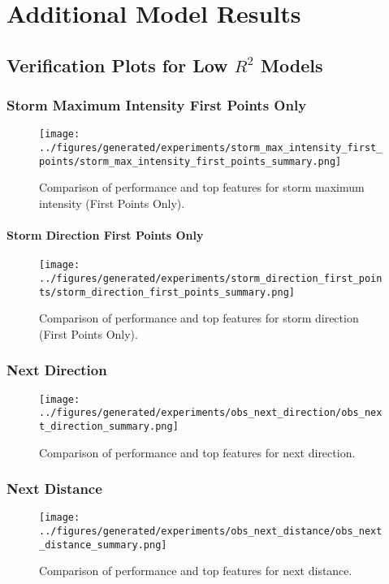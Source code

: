 \chapter{Additional Model Results}
\label{appn:modelresults}

\section{Verification Plots for Low $R^2$ Models}

\subsection{Storm Maximum Intensity First Points Only}

\begin{figure}[h]
    \centering
    \texttt{[image: ../figures/generated/experiments/storm\_max\_intensity\_first\_points/storm\_max\_intensity\_first\_points\_summary.png]}
    \caption{Comparison of performance and top features for storm maximum intensity (First Points Only).}
    \label{fig:storm_max_intensity_first_points_summary}
\end{figure}

\subsubsection{Storm Direction First Points Only}

\begin{figure}[h]
    \centering
    \texttt{[image: ../figures/generated/experiments/storm\_direction\_first\_points/storm\_direction\_first\_points\_summary.png]}
    \caption{Comparison of performance and top features for storm direction (First Points Only).}
    \label{fig:storm_direction_first_points_summary}
\end{figure}

\subsection{Next Direction}

\begin{figure}[ht]
    \centering
    \texttt{[image: ../figures/generated/experiments/obs\_next\_direction/obs\_next\_direction\_summary.png]}
    \caption{Comparison of performance and top features for next direction.}
    \label{fig:obs_direction_summary}
\end{figure}

\subsection{Next Distance}

\begin{figure}[ht]
    \centering
    \texttt{[image: ../figures/generated/experiments/obs\_next\_distance/obs\_next\_distance\_summary.png]}
    \caption{Comparison of performance and top features for next distance.}
    \label{fig:obs_distance_summary}
\end{figure}